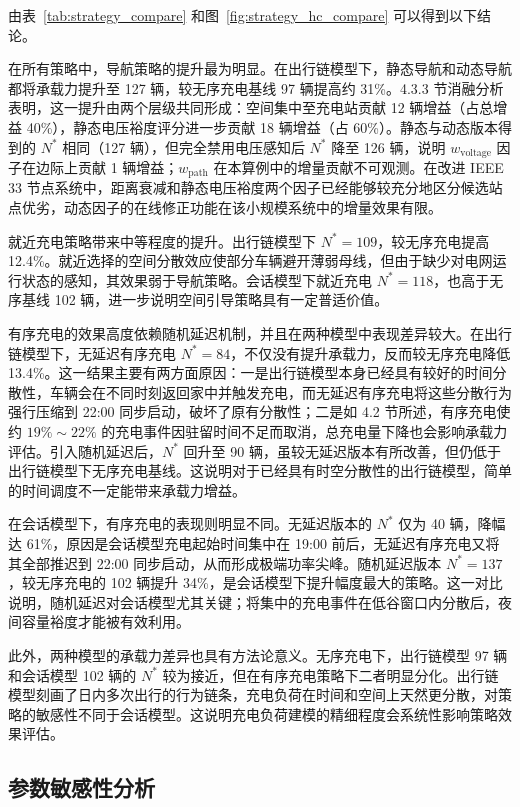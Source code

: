 \documentclass[10pt,a4paper]{article}
\numberwithin{equation}{section}
\numberwithin{table}{section}
\numberwithin{figure}{section}
\begin{document}
    由表~\ref{tab:strategy_compare} 和图~\ref{fig:strategy_hc_compare} 可以得到以下结论。

    在所有策略中，导航策略的提升最为明显。在出行链模型下，静态导航和动态导航都将承载力提升至 127 辆，较无序充电基线 97 辆提高约 31\%。4.3.3 节消融分析表明，这一提升由两个层级共同形成：空间集中至充电站贡献 12 辆增益（占总增益 40\%），静态电压裕度评分进一步贡献 18 辆增益（占 60\%）。静态与动态版本得到的 $N^*$ 相同（127 辆），但完全禁用电压感知后 $N^*$ 降至 126 辆，说明 $w_{\text{voltage}}$ 因子在边际上贡献 1 辆增益；$w_{\text{path}}$ 在本算例中的增量贡献不可观测。在改进 IEEE 33 节点系统中，距离衰减和静态电压裕度两个因子已经能够较充分地区分候选站点优劣，动态因子的在线修正功能在该小规模系统中的增量效果有限。

    就近充电策略带来中等程度的提升。出行链模型下 $N^* = 109$，较无序充电提高 12.4\%。就近选择的空间分散效应使部分车辆避开薄弱母线，但由于缺少对电网运行状态的感知，其效果弱于导航策略。会话模型下就近充电 $N^* = 118$，也高于无序基线 102 辆，进一步说明空间引导策略具有一定普适价值。

    有序充电的效果高度依赖随机延迟机制，并且在两种模型中表现差异较大。在出行链模型下，无延迟有序充电 $N^* = 84$，不仅没有提升承载力，反而较无序充电降低 13.4\%。这一结果主要有两方面原因：一是出行链模型本身已经具有较好的时间分散性，车辆会在不同时刻返回家中并触发充电，而无延迟有序充电将这些分散行为强行压缩到 22:00 同步启动，破坏了原有分散性；二是如 4.2 节所述，有序充电使约 $19\%\sim22\%$ 的充电事件因驻留时间不足而取消，总充电量下降也会影响承载力评估。引入随机延迟后，$N^*$ 回升至 90 辆，虽较无延迟版本有所改善，但仍低于出行链模型下无序充电基线。这说明对于已经具有时空分散性的出行链模型，简单的时间调度不一定能带来承载力增益。

    在会话模型下，有序充电的表现则明显不同。无延迟版本的 $N^*$ 仅为 40 辆，降幅达 61\%，原因是会话模型充电起始时间集中在 19:00 前后，无延迟有序充电又将其全部推迟到 22:00 同步启动，从而形成极端功率尖峰。随机延迟版本 $N^* = 137$，较无序充电的 102 辆提升 34\%，是会话模型下提升幅度最大的策略。这一对比说明，随机延迟对会话模型尤其关键；将集中的充电事件在低谷窗口内分散后，夜间容量裕度才能被有效利用。

    此外，两种模型的承载力差异也具有方法论意义。无序充电下，出行链模型 97 辆和会话模型 102 辆的 $N^*$ 较为接近，但在有序充电策略下二者明显分化。出行链模型刻画了日内多次出行的行为链条，充电负荷在时间和空间上天然更分散，对策略的敏感性不同于会话模型。这说明充电负荷建模的精细程度会系统性影响策略效果评估。

    \subsection{参数敏感性分析}
\end{document}

